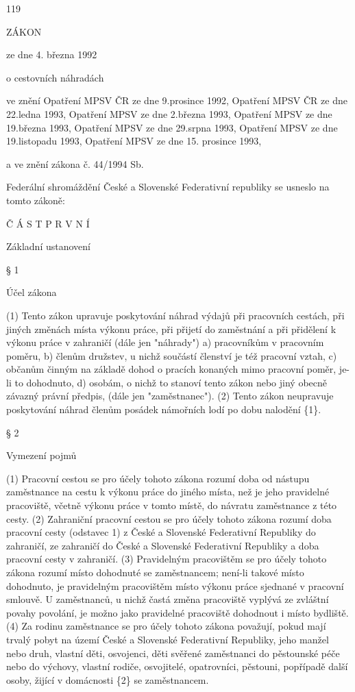 \documentclass[11pt,a4paper]{article}
\begin{document}
119

ZÁKON

ze dne 4. března 1992

o cestovních náhradách

ve znění Opatření MPSV ČR ze dne 9.prosince 1992, Opatření MPSV ČR ze dne 22.ledna 1993, Opatření MPSV ze dne 2.března 1993, Opatření MPSV ze dne 19.března 1993, Opatření MPSV ze dne 29.srpna 1993, Opatření MPSV ze dne 19.listopadu 1993, Opatření MPSV ze dne 15. prosince 1993,

a ve znění zákona č. 44/1994 Sb.

Federální shromáždění České a Slovenské Federativní republiky se usneslo na tomto zákoně:

Č Á S T P R V N Í

Základní ustanovení

§ 1

Účel zákona

(1) Tento zákon upravuje poskytování náhrad výdajů při pracovních cestách, při jiných změnách místa výkonu práce, při přijetí do zaměstnání a při přidělení k výkonu práce v zahraničí (dále jen "náhrady") a) pracovníkům v pracovním poměru, b) členům družstev, u nichž součástí členství je též pracovní vztah, c) občanům činným na základě dohod o pracích konaných mimo pracovní poměr, je-li to dohodnuto, d) osobám, o nichž to stanoví tento zákon nebo jiný obecně závazný právní předpis, (dále jen "zaměstnanec"). (2) Tento zákon neupravuje poskytování náhrad členům posádek námořních lodí po dobu nalodění \{1\}.

§ 2

Vymezení pojmů

(1) Pracovní cestou se pro účely tohoto zákona rozumí doba od nástupu zaměstnance na cestu k výkonu práce do jiného místa, než je jeho pravidelné pracoviště, včetně výkonu práce v tomto místě, do návratu zaměstnance z této cesty. (2) Zahraniční pracovní cestou se pro účely tohoto zákona rozumí doba pracovní cesty (odstavec 1) z České a Slovenské Federativní Republiky do zahraničí, ze zahraničí do České a Slovenské Federativní Republiky a doba pracovní cesty v zahraničí. (3) Pravidelným pracovištěm se pro účely tohoto zákona rozumí místo dohodnuté se zaměstnancem; není-li takové místo dohodnuto, je pravidelným pracovištěm místo výkonu práce sjednané v pracovní smlouvě. U zaměstnanců, u nichž častá změna pracoviště vyplývá ze zvláštní povahy povolání, je možno jako pravidelné pracoviště dohodnout i místo bydliště. (4) Za rodinu zaměstnance se pro účely tohoto zákona považují, pokud mají trvalý pobyt na území České a Slovenské Federativní Republiky, jeho manžel nebo druh, vlastní děti, osvojenci, děti svěřené zaměstnanci do pěstounské péče nebo do výchovy, vlastní rodiče, osvojitelé, opatrovníci, pěstouni, popřípadě další osoby, žijící v domácnosti \{2\} se zaměstnancem.
\end{document}
